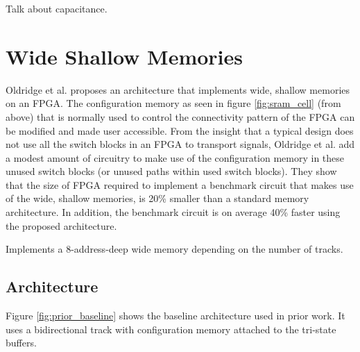 Talk about capacitance.

\section{Wide Shallow Memories}
\label{bg:wideshallowmem}

Oldridge et al. \cite{Oldridge2005AMemories} proposes an architecture that implements wide, shallow memories on an FPGA. The configuration memory as seen in figure \ref{fig:sram_cell} (from above) that is normally used to control the connectivity pattern of the FPGA can be modified and made user accessible. From the insight that a typical design does not use all the switch blocks in an FPGA to transport signals, Oldridge et al. add a modest amount of circuitry to make use of the configuration memory in these unused switch blocks (or unused paths within used switch blocks). They show that the size of FPGA required to implement a benchmark circuit that makes use of the wide, shallow memories, is 20\% smaller than a standard memory architecture. In addition, the benchmark circuit is on average 40\% faster using the proposed architecture.

Implements a 8-address-deep wide memory depending on the number of tracks.
\subsection{Architecture}
Figure \ref{fig:prior_baseline} shows the baseline architecture used in prior work. It uses a bidirectional track with configuration memory attached to the tri-state buffers.

